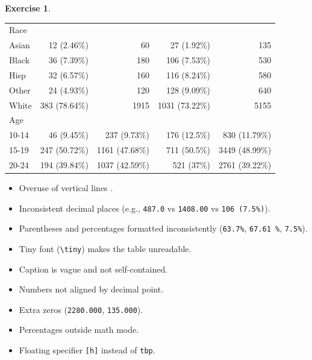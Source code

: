 \documentclass[
]{book}
\providecommand{\tightlist}{%
  \setlength{\itemsep}{0pt}\setlength{\parskip}{0pt}}
\theoremstyle{definition}
\theoremstyle{definition}
\theoremstyle{definition}
\newtheorem{exercise}{Exercise}[chapter]
\theoremstyle{definition}
\theoremstyle{remark}
\begin{document}
\begin{exercise}
\begin{table}[h]
\begin{tabular}[t]{l r r r r}
Race &  &  &  & \\
\hspace{2em}Asian & 12 (2.46\%) & 60 & 27 (1.92\%) & 135 \\
\hspace{2em}Black & 36 (7.39\%) & 180 & 106 (7.53\%) & 530 \\
\hspace{2em}Hisp & 32 (6.57\%) & 160 & 116 (8.24\%) & 580 \\
\hspace{2em}Other & 24 (4.93\%) & 120 & 128 (9.09\%) & 640\\
\hspace{2em}White & 383 (78.64\%) & 1915  & 1031 (73.22\%) & 5155 \\

Age &  &  &  & \\
\hspace{2em} 10-14 & 46 (9.45\%) & 237 (9.73\%) & 176 (12.5\%) & 830 (11.79\%)\\
\hspace{2em} 15-19 & 247 (50.72\%) & 1161 (47.68\%) & 711 (50.5\%) & 3449 (48.99\%)\\
\hspace{2em} 20-24 & 194 (39.84\%) & 1037 (42.59\%) & 521 (37\%) & 2761 (39.22\%)\\
\bottomrule
\end{tabular}
\label{tab:hidd_cohort_demo}
\end{table}

\begin{itemize}
\tightlist
\item
  Overuse of vertical lines \texttt{\textbar{}}.
\item
  Inconsistent decimal places (e.g., \texttt{487.0} vs \texttt{1408.00} vs \texttt{106\ (7.5\%)}).
\item
  Parentheses and percentages formatted inconsistently (\texttt{63.7\%}, \texttt{67.61\ \%}, \texttt{7.5\%}).
\item
  Tiny font (\texttt{\textbackslash{}tiny}) makes the table unreadable.
\item
  Caption is vague and not self-contained.
\item
  Numbers not aligned by decimal point.
\item
  Extra zeros (\texttt{2280.000}, \texttt{135.000}).
\item
  Percentages outside math mode.
\item
  Floating specifier \texttt{{[}h{]}} instead of \texttt{tbp}.
\end{itemize}

\end{exercise}
\end{document}
